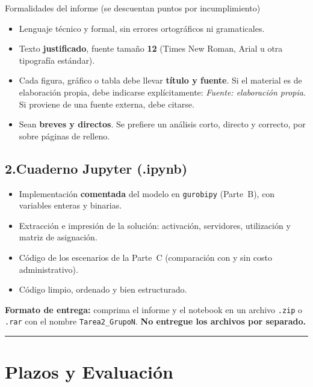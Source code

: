 \documentclass[12pt,a4paper]{article}
\begin{document}
\begin{ayuda}{Formalidades del informe (se descuentan puntos por incumplimiento)}
\begin{itemize}[topsep=2pt]
    \item Lenguaje técnico y formal, sin errores ortográficos ni gramaticales.
    \item Texto \textbf{justificado}, fuente tamaño \textbf{12}
          (Times New Roman, Arial u otra tipografía estándar).
    \item Cada figura, gráfico o tabla debe llevar \textbf{título y fuente}.
          Si el material es de elaboración propia, debe indicarse
          explícitamente: \emph{Fuente: elaboración propia}. Si proviene de una
          fuente externa, debe citarse.
    \item Sean \textbf{breves y directos}. Se prefiere un análisis corto,
          directo y correcto, por sobre páginas de relleno.
\end{itemize}
\end{ayuda}

\subsection*{2.\quad Cuaderno Jupyter (.ipynb)}

\begin{itemize}[topsep=2pt]
    \item Implementación \textbf{comentada} del modelo en \texttt{gurobipy}
          (Parte~B), con variables enteras y binarias.
    \item Extracción e impresión de la solución: activación, servidores,
          utilización y matriz de asignación.
    \item Código de los escenarios de la Parte~C (comparación con y sin costo
          administrativo).
    \item Código limpio, ordenado y bien estructurado.
\end{itemize}

\medskip
\noindent\textbf{Formato de entrega:} comprima el informe y el notebook en un
archivo \texttt{.zip} o \texttt{.rar} con el nombre \texttt{Tarea2\_GrupoN}.
\textbf{No entregue los archivos por separado.}

\noindent\rule{\linewidth}{0.4pt}

\section*{Plazos y Evaluación}
\end{document}
